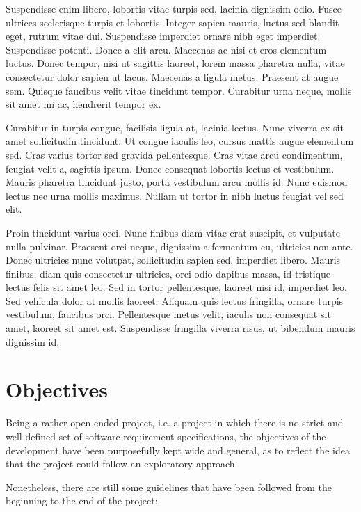Suspendisse enim libero, lobortis vitae turpis sed, lacinia dignissim odio. Fusce ultrices scelerisque turpis et lobortis. Integer sapien mauris, luctus sed blandit eget, rutrum vitae dui. Suspendisse imperdiet ornare nibh eget imperdiet. Suspendisse potenti. Donec a elit arcu. Maecenas ac nisi et eros elementum luctus. Donec tempor, nisi ut sagittis laoreet, lorem massa pharetra nulla, vitae consectetur dolor sapien ut lacus. Maecenas a ligula metus. Praesent at augue sem. Quisque faucibus velit vitae tincidunt tempor. Curabitur urna neque, mollis sit amet mi ac, hendrerit tempor ex.

Curabitur in turpis congue, facilisis ligula at, lacinia lectus. Nunc viverra ex sit amet sollicitudin tincidunt. Ut congue iaculis leo, cursus mattis augue elementum sed. Cras varius tortor sed gravida pellentesque. Cras vitae arcu condimentum, feugiat velit a, sagittis ipsum. Donec consequat lobortis lectus et vestibulum. Mauris pharetra tincidunt justo, porta vestibulum arcu mollis id. Nunc euismod lectus nec urna mollis maximus. Nullam ut tortor in nibh luctus feugiat vel sed elit.

Proin tincidunt varius orci. Nunc finibus diam vitae erat suscipit, et vulputate nulla pulvinar. Praesent orci neque, dignissim a fermentum eu, ultricies non ante. Donec ultricies nunc volutpat, sollicitudin sapien sed, imperdiet libero. Mauris finibus, diam quis consectetur ultricies, orci odio dapibus massa, id tristique lectus felis sit amet leo. Sed in tortor pellentesque, laoreet nisi id, imperdiet leo. Sed vehicula dolor at mollis laoreet. Aliquam quis lectus fringilla, ornare turpis vestibulum, faucibus orci. Pellentesque metus velit, iaculis non consequat sit amet, laoreet sit amet est. Suspendisse fringilla viverra risus, ut bibendum mauris dignissim id.

\section{Objectives}\label{sec:objectives}
Being a rather open-ended project, i.e. a project in which there is no strict and well-defined set of software requirement specifications, the objectives of the development have been purposefully kept wide and general, as to reflect the idea that the project could follow an exploratory approach.

Nonetheless, there are still some guidelines that have been followed from the beginning to the end of the project:

